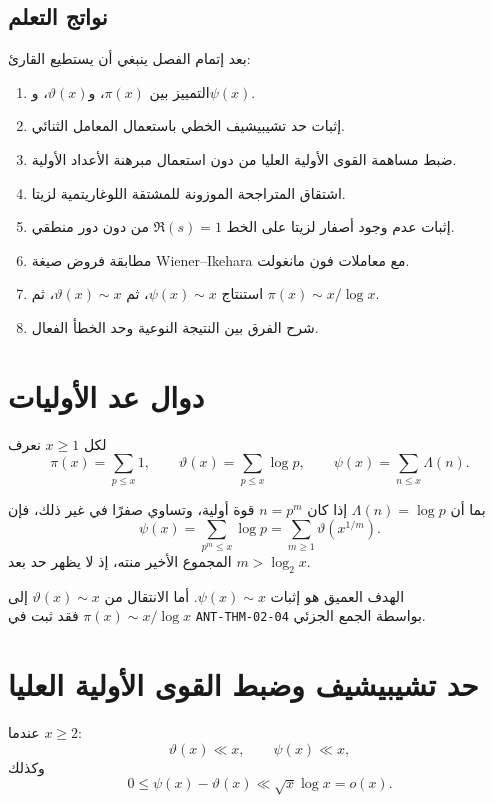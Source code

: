 \subsection{نواتج التعلم}

بعد إتمام الفصل ينبغي أن يستطيع القارئ:
\begin{enumerate}
  \item التمييز بين \(\pi(x)\)، و\(\vartheta(x)\)، و\(\psi(x)\).
  \item إثبات حد تشيبيشيف الخطي باستعمال المعامل الثنائي.
  \item ضبط مساهمة القوى الأولية العليا من دون استعمال مبرهنة الأعداد الأولية.
  \item اشتقاق المتراجحة الموزونة للمشتقة اللوغاريتمية لزيتا.
  \item إثبات عدم وجود أصفار لزيتا على الخط \(\Re(s)=1\) من دون دور منطقي.
  \item مطابقة فروض صيغة Wiener--Ikehara مع معاملات فون مانغولت.
  \item استنتاج \(\psi(x)\sim x\)، ثم \(\vartheta(x)\sim x\)، ثم
  \(\pi(x)\sim x/\log x\).
  \item شرح الفرق بين النتيجة النوعية وحد الخطأ الفعال.
\end{enumerate}

\section{دوال عد الأوليات}

لكل \(x\ge1\) نعرف
\[
\pi(x)=\sum_{p\le x}1,
\qquad
\vartheta(x)=\sum_{p\le x}\log p,
\qquad
\psi(x)=\sum_{n\le x}\Lambda(n).
\]

بما أن \(\Lambda(n)=\log p\) إذا كان \(n=p^m\) قوة أولية، وتساوي صفرًا
في غير ذلك، فإن
\[
\psi(x)
=
\sum_{p^m\le x}\log p
=
\sum_{m\ge1}\vartheta\!\left(x^{1/m}\right).
\]
المجموع الأخير منته، إذ لا يظهر حد بعد \(m>\log_2x\).

الهدف العميق هو إثبات \(\psi(x)\sim x\). أما الانتقال من
\(\vartheta(x)\sim x\) إلى \(\pi(x)\sim x/\log x\) فقد ثبت في
\textenglish{\texttt{ANT-THM-02-04}} بواسطة الجمع الجزئي.

\section{حد تشيبيشيف وضبط القوى الأولية العليا}

\begin{lemma}
\label{lem:chebyshev-and-higher-prime-powers}
\provedhere
عندما \(x\ge2\):
\[
\vartheta(x)\ll x,
\qquad
\psi(x)\ll x,
\]
وكذلك
\[
0\le\psi(x)-\vartheta(x)
\ll\sqrt{x}\log x=o(x).
\]
\end{lemma}

